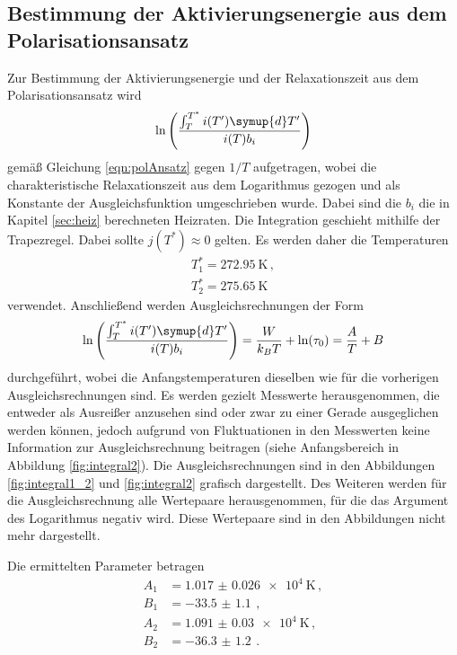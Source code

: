 \newpage
\subsection{Bestimmung der Aktivierungsenergie aus dem Polarisationsansatz}
\label{subsec:polarisation}

Zur Bestimmung der Aktivierungsenergie und der Relaxationszeit aus dem Polarisationsansatz wird
\begin{equation*}
	\ln\left(\frac{\int_T^{T^*}i(T') \symup{d}T'}{i(T) b_i}\right)
\end{equation*}
gemäß Gleichung \eqref{eqn:polAnsatz} gegen $1/T$ aufgetragen, wobei die charakteristische Relaxationszeit aus dem Logarithmus gezogen und als Konstante der Ausgleichsfunktion umgeschrieben wurde. Dabei sind die $b_i$ die in Kapitel \ref{sec:heiz}
berechneten Heizraten. Die Integration geschieht mithilfe der Trapezregel. Dabei sollte $j(T^*)\approx 0$ gelten. Es werden daher die Temperaturen
\begin{align*}
	T_1^*=\SI{272.95}{\kelvin} \,, \\
	T_2^*=\SI{275.65}{\kelvin}
\end{align*}
verwendet.
Anschließend werden Ausgleichsrechnungen der Form
\begin{equation*}
	\ln\left(\frac{\int_T^{T^*}i(T') \symup{d}T'}{i(T) b_i}\right) =\frac{W}{k_B T}+\ln(\tau_0)=\frac{A}{T}+B
\end{equation*}
durchgeführt, wobei die Anfangstemperaturen dieselben wie für die vorherigen Ausgleichsrechnungen sind. Es werden gezielt Messwerte herausgenommen, die entweder als Ausreißer anzusehen sind oder zwar zu einer Gerade ausgeglichen werden können, jedoch aufgrund von Fluktuationen in den Messwerten keine Information zur Ausgleichsrechnung beitragen (siehe Anfangsbereich in Abbildung \ref{fig:integral2}). Die Ausgleichsrechnungen sind in den
Abbildungen \ref{fig:integral1_2} und \ref{fig:integral2} grafisch dargestellt.
Des Weiteren werden für die Ausgleichsrechnung alle Wertepaare herausgenommen, für die das Argument des Logarithmus negativ wird. Diese Wertepaare sind in den Abbildungen nicht mehr dargestellt.

Die ermittelten Parameter betragen
\begin{align*}
  A_1&=\SI{1.017(26)e+4}{\kelvin} \,, \\
  B_1&=\SI{-33.5(11)}{}  \,, \\
  A_2&=\SI{1.091(30)e+4}{\kelvin} \,, \\
  B_2&=\SI{-36.3(12)}{}  \,.
\end{align*}

